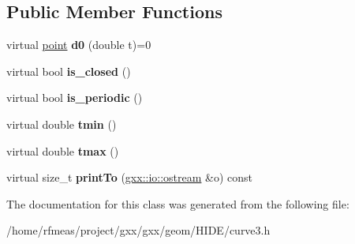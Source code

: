 \subsection*{Public Member Functions}
\begin{DoxyCompactItemize}
\item 
virtual \hyperlink{classgxx_1_1geom3_1_1point}{point} {\bfseries d0} (double t)=0\hypertarget{classgxx_1_1curve3_1_1curve_a84f0f6d4aeebe521e8e26e47459594d5}{}\label{classgxx_1_1curve3_1_1curve_a84f0f6d4aeebe521e8e26e47459594d5}

\item 
virtual bool {\bfseries is\+\_\+closed} ()\hypertarget{classgxx_1_1curve3_1_1curve_a379db289818f96a48aa84273fa32718f}{}\label{classgxx_1_1curve3_1_1curve_a379db289818f96a48aa84273fa32718f}

\item 
virtual bool {\bfseries is\+\_\+periodic} ()\hypertarget{classgxx_1_1curve3_1_1curve_ac19c573b85e6bff4b858071649c2fb14}{}\label{classgxx_1_1curve3_1_1curve_ac19c573b85e6bff4b858071649c2fb14}

\item 
virtual double {\bfseries tmin} ()\hypertarget{classgxx_1_1curve3_1_1curve_a46210bc3f70e1687fce994b84ab809be}{}\label{classgxx_1_1curve3_1_1curve_a46210bc3f70e1687fce994b84ab809be}

\item 
virtual double {\bfseries tmax} ()\hypertarget{classgxx_1_1curve3_1_1curve_a20e52a188719bd1c5eaac3a3c8d85283}{}\label{classgxx_1_1curve3_1_1curve_a20e52a188719bd1c5eaac3a3c8d85283}

\item 
virtual size\+\_\+t {\bfseries print\+To} (\hyperlink{classgxx_1_1io_1_1ostream}{gxx\+::io\+::ostream} \&o) const \hypertarget{classgxx_1_1curve3_1_1curve_aaedeec15809c75fb9973e49fab3fb3c0}{}\label{classgxx_1_1curve3_1_1curve_aaedeec15809c75fb9973e49fab3fb3c0}

\end{DoxyCompactItemize}


The documentation for this class was generated from the following file\+:\begin{DoxyCompactItemize}
\item 
/home/rfmeas/project/gxx/gxx/geom/\+H\+I\+D\+E/curve3.\+h\end{DoxyCompactItemize}
